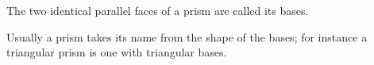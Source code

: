 The two identical parallel faces of a prism are called its bases.
\par
Usually a prism takes its name from the shape of the bases;
for instance a triangular prism is one with triangular bases.